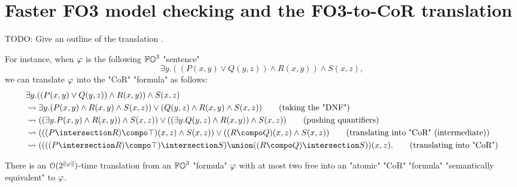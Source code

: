 \section{Faster FO3 model checking and the FO3-to-CoR translation}\label{sec: fo3 to CoR}


\begin{yoshiki}
TODO: Give an outline of the translation \cite{nakamuraExpressivePowerSuccinctness2022}.
\end{yoshiki}

For instance, when $\fml$ is the following $\mathbb{FO}^{3}$ "sentence"
\[\exists y. ((P(x, y) \lor Q(y, z)) \land R(x, y)) \land S(x, z),\]
we can translate $\fml$ into the "CoR" "formula" as follows:
\begin{align*}
& \exists y. ((P(x, y) \lor Q(y, z)) \land R(x, y)) \land S(x, z)\\
& \leadsto \exists y. (P(x, y) \land R(x, y) \land S(x, z)) \lor (Q(y, z) \land R(x, y) \land S(x, z)) \tag{taking the "DNF"}\\
& \leadsto ((\exists y. P(x, y) \land R(x, y)) \land S(x, z)) \lor ((\exists y. Q(y, z) \land R(x, y)) \land S(x, z)) \tag{pushing quantifiers}\\
& \leadsto (((P \intersection R) \compo \top)(x, z) \land S(x, z)) \lor ((R \compo Q)(x, z) \land S(x, z)) \tag{translating into "CoR" (intermediate)}\\
& \leadsto ((((P \intersection R) \compo \top) \intersection S) \union ((R \compo Q) \intersection S))(x, z). \tag{translating into "CoR"}
\end{align*}

\begin{proposition}\label{proposition: fo3 to atomic CoR}
    There is an $\mathcal{O}(2^{\len{\fml}})$-time translation
    from an $\mathbb{FO}^{3}$ "formula" $\fml$ with at most two free 
    into an "atomic" "CoR" "formula" "semantically equivalent" to $\fml$.
\end{proposition}


